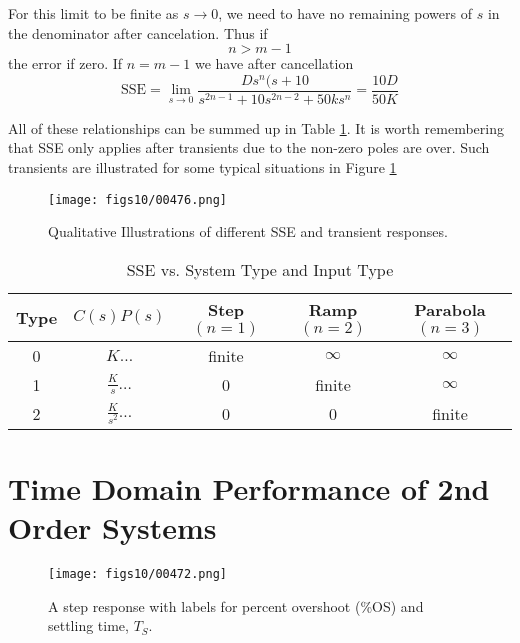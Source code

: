 For this limit to be finite as $s\to 0$, we need to have no remaining powers of $s$ in the denominator after cancelation.  Thus  if
\[
n > m-1
\]
the error if zero.   If $n=m-1$ we have after cancellation
\[
\mathrm{SSE} = \lim_{s\to 0} \frac  {Ds^n(s+10}   {s^{2n-1} + 10s^{2n-2} + 50ks^n} = \frac {10D}  {50K}
\] 


All of these relationships can be summed up in Table \ref{SystemTypeError}.    
It is worth remembering that SSE only applies after transients due to the non-zero poles are over.  Such transients are illustrated for some typical situations in Figure \ref{SSEtransients}


\begin{figure}\centering
\texttt{[image: figs10/00476.png]}
\caption{Qualitative Illustrations of different SSE and transient responses.}\label{SSEtransients}
\end{figure} 




\begin{table}\centering
\begin{tabular}{|c|c|c|c|c|} \hline
Type	&	$C(s)P(s)$	&	Step $(n=1)$	&	Ramp $(n=2)$	& 	Parabola $(n=3)$   \\ \hline
0	&	$K\dots$	&	finite		&	$\infty$	&	$\infty$	   \\ \hline
1	&	$\frac{K}{s}\dots$&	0		&	finite		&	$\infty$	   \\ \hline
2	&	$\frac{K}{s^2}\dots$&0		&       0        	&	finite		   \\ \hline
\end{tabular}

\caption{SSE vs. System Type and Input Type}\label{SystemTypeError}
\end{table}




\section{Time Domain Performance of 2nd Order Systems}


\begin{figure}\centering
\texttt{[image: figs10/00472.png]}
\caption{A step response with labels for percent overshoot (\%OS) and settling time, $T_S$.}\label{stepresponse}
\end{figure}
 


